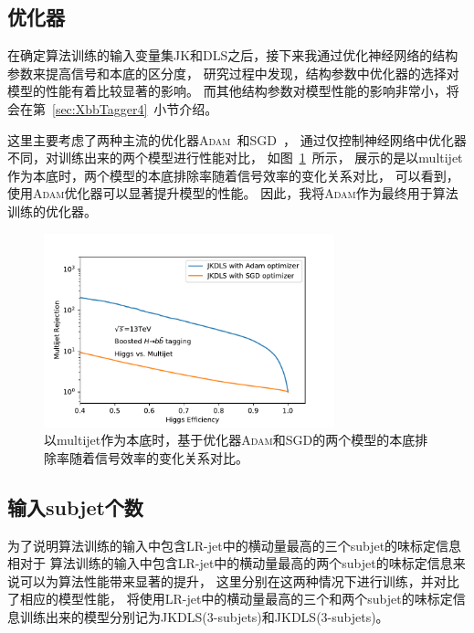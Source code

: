\subsection{优化器}
\label{sec:XbbTagger2}

在确定算法训练的输入变量集JK和DLS之后，接下来我通过优化神经网络的结构参数来提高信号和本底的区分度，
研究过程中发现，结构参数中优化器的选择对模型的性能有着比较显著的影响。
而其他结构参数对模型性能的影响非常小，将会在第~\ref{sec:XbbTagger4}~小节介绍。

这里主要考虑了两种主流的优化器\textsc{Adam}~\cite{Kingma:2014}和\textsc{SGD}~\cite{SGD}，
通过仅控制神经网络中优化器不同，对训练出来的两个模型进行性能对比，
如图~\ref{fig:XbbTagger2}~所示，
展示的是以multijet作为本底时，两个模型的本底排除率随着信号效率的变化关系对比，
可以看到，使用\textsc{Adam}优化器可以显著提升模型的性能。
因此，我将\textsc{Adam}作为最终用于算法训练的优化器。

\begin{figure}
  \begin{center}
    \includegraphics[width=0.75\textwidth]{figuresXbb/XbbTagger2a.pdf}
  \end{center}
  \caption{
  以multijet作为本底时，基于优化器\textsc{Adam}和\textsc{SGD}的两个模型的本底排除率随着信号效率的变化关系对比。
  }
    \label{fig:XbbTagger2}
\end{figure}


\subsection{输入subjet个数}
\label{sec:XbbTagger25}

为了说明算法训练的输入中包含LR-jet中的横动量最高的三个subjet的味标定信息相对于
算法训练的输入中包含LR-jet中的横动量最高的两个subjet的味标定信息来说可以为算法性能带来显著的提升，
这里分别在这两种情况下进行训练，并对比了相应的模型性能，
将使用LR-jet中的横动量最高的三个和两个subjet的味标定信息训练出来的模型分别记为JKDLS(3-subjets)和JKDLS(3-subjets)。

